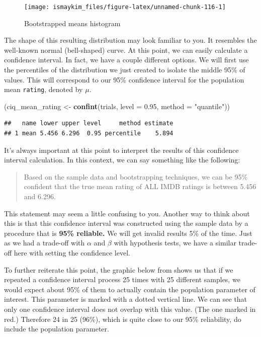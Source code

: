 \documentclass[]{tufte-book}
\newenvironment{Shaded}{\begin{snugshade}}{\end{snugshade}}
\newcommand{\KeywordTok}[1]{\textcolor[rgb]{0.13,0.29,0.53}{\textbf{{#1}}}}
\newcommand{\DataTypeTok}[1]{\textcolor[rgb]{0.13,0.29,0.53}{{#1}}}
\newcommand{\FloatTok}[1]{\textcolor[rgb]{0.00,0.00,0.81}{{#1}}}
\newcommand{\StringTok}[1]{\textcolor[rgb]{0.31,0.60,0.02}{{#1}}}
\newcommand{\NormalTok}[1]{{#1}}
\begin{document}
\begin{figure}

{\centering \texttt{[image: ismaykim\_files/figure-latex/unnamed-chunk-116-1]} 

}

\caption[Bootstrapped means histogram]{Bootstrapped means histogram}\label{fig:unnamed-chunk-116}
\end{figure}

The shape of this resulting distribution may look familiar to you. It
resembles the well-known normal (bell-shaped) curve. At this point, we
can easily calculate a confidence interval. In fact, we have a couple
different options. We will first use the percentiles of the distribution
we just created to isolate the middle 95\% of values. This will
correspond to our 95\% confidence interval for the population mean
\texttt{rating}, denoted by \(\mu\).

\begin{Shaded}
\begin{Highlighting}[]
\NormalTok{(ciq_mean_rating <-}\StringTok{ }\KeywordTok{confint}\NormalTok{(trials, }\DataTypeTok{level =} \FloatTok{0.95}\NormalTok{, }\DataTypeTok{method =} \StringTok{"quantile"}\NormalTok{))}
\end{Highlighting}
\end{Shaded}

\begin{verbatim}
##   name lower upper level     method estimate
## 1 mean 5.456 6.296  0.95 percentile    5.894
\end{verbatim}

It's always important at this point to interpret the results of this
confidence interval calculation. In this context, we can say something
like the following:

\begin{quote}
Based on the sample data and bootstrapping techniques, we can be 95\%
confident that the true mean rating of ALL IMDB ratings is between 5.456
and 6.296.
\end{quote}

This statement may seem a little confusing to you. Another way to think
about this is that this confidence interval was constructed using the
sample data by a procedure that is \textbf{95\% reliable.} We will get
invalid results 5\% of the time. Just as we had a trade-off with
\(\alpha\) and \(\beta\) with hypothesis tests, we have a similar
trade-off here with setting the confidence level.

To further reiterate this point, the graphic below from \citet{isrs2014}
shows us that if we repeated a confidence interval process 25 times with
25 different samples, we would expect about 95\% of them to actually
contain the population parameter of interest. This parameter is marked
with a dotted vertical line. We can see that only one confidence
interval does not overlap with this value. (The one marked in red.)
Therefore 24 in 25 (96\%), which is quite close to our 95\% reliability,
do include the population parameter.
\end{document}
